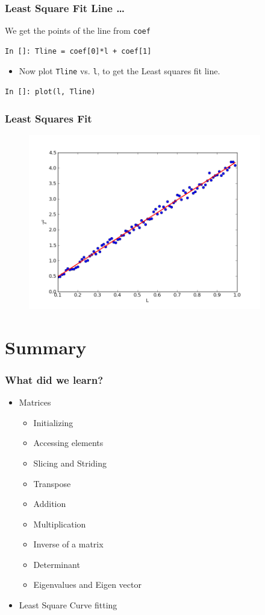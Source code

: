 \documentclass[14pt,compress]{beamer}
\newcommand{\typ}[1]{\lstinline{#1}}
\begin{document}
\begin{frame}[fragile]
\frametitle{Least Square Fit Line \ldots}
We get the points of the line from \typ{coef}
\begin{lstlisting}
In []: Tline = coef[0]*l + coef[1]
\end{lstlisting}
\begin{itemize}
\item Now plot \typ{Tline} vs. \typ{l}, to get the Least squares fit line. 
\end{itemize}
\begin{lstlisting}
In []: plot(l, Tline)
\end{lstlisting}
\end{frame}

\begin{frame}[fragile]
\frametitle{Least Squares Fit}
\vspace{-0.15in}
\begin{figure}
\includegraphics[width=4in]{data/least-sq-fit}
\end{figure}
\end{frame}

\section{Summary}
\begin{frame}
  \frametitle{What did we learn?}
  \begin{itemize}
  \item Matrices
    \begin{itemize}
      \item Initializing
      \item Accessing elements
      \item Slicing and Striding
      \item Transpose
      \item Addition
      \item Multiplication
      \item Inverse of a matrix
      \item Determinant
      \item Eigenvalues and Eigen vector
    \end{itemize}
  \item Least Square Curve fitting
  \end{itemize}
\end{frame}
\end{document}
